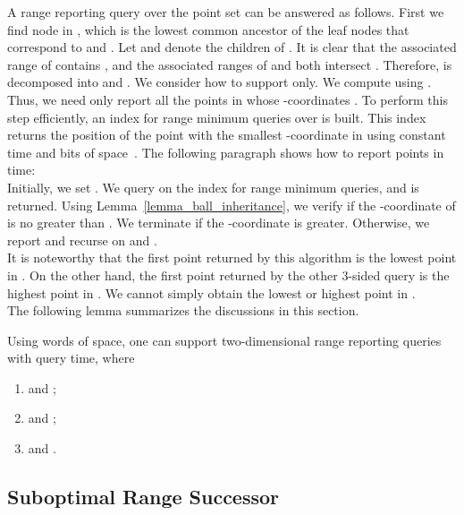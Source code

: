 \documentclass{llncs}
\begin{document}
\indent A range reporting query  over the point set  can be answered as follows.
First we find node  in , which is the lowest common ancestor of the leaf nodes that correspond to  and .
Let  and  denote the children of .
It is clear that the associated range of  contains ,
and the associated ranges of  and  both intersect .
Therefore,  is decomposed into  and .
We consider how to support  only.
We compute  using .
Thus, we need only report all the points in  whose -coordinates .
To perform this step efficiently, an index for range minimum queries over  is built.
This index returns the position of the point with the smallest -coordinate in  using constant time
and  bits of space~\cite{DBLP:journals/siamcomp/FischerH11}.
The following paragraph shows how to report  points in  time: \\
\indent Initially, we set .
We query  on the index for range minimum queries, and  is returned.
Using Lemma~\ref{lemma_ball_inheritance}, we verify if the -coordinate of  is no greater than .
We terminate if the -coordinate is greater.
Otherwise, we report  and recurse on  and . \\
\indent It is noteworthy that the first point returned by this algorithm is the lowest point in .
On the other hand, the first point returned by the other 3-sided query is the highest point in .
We cannot simply obtain the lowest or highest point in . \\
\indent The following lemma summarizes the discussions in this section.
\begin{lemma}
    \label{lemma_unsorted_range_reporting}
    Using  words of space,
    one can support two-dimensional range reporting queries with  query time,
    where
    \begin{enumerate}
        \item  and ;
        \item  and ;
        \item  and .
    \end{enumerate}
\end{lemma}

\subsection{Suboptimal Range Successor}
\end{document}
